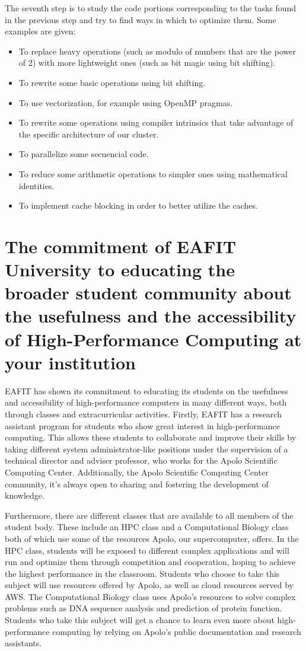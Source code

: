 \documentclass[11pt,a4paper,twocolumn]{article}
\begin{document}
The seventh step is to study the code portions corresponding to the tasks found in the previous step and try to find ways in which to optimize them. Some examples are given:

\begin{itemize}
    \item To replace heavy operations (such as modulo of numbers that are the power of 2) with more lightweight ones (such as bit magic using bit shifting).
    \item To rewrite some basic operations using bit shifting.
    \item To use vectorization, for example using OpenMP pragmas.
    \item To rewrite some operations using compiler intrinsics that take advantage of the specific architecture of our cluster.
    \item To parallelize some secuencial code.
    \item To reduce some arithmetic operations to simpler ones using mathematical identities.
    \item To implement cache blocking in order to better utilize the caches.
\end{itemize}

\section{The commitment of EAFIT University to educating the broader student community about the usefulness and the accessibility of High-Performance Computing at your institution}

EAFIT has shown its commitment to educating its students on the usefulness and accessibility of high-performance computers in many different ways, both through classes and extracurricular activities. Firstly, EAFIT has a research assistant program for students who show great interest in high-performance computing. This allows these students to collaborate and improve their skills by taking different system administrator-like positions under the supervision of a technical director and adviser professor, who works for the Apolo Scientific Computing Center. Additionally, the Apolo Scientific Computing Center community, it's always open to sharing and fostering the development of knowledge.

Furthermore, there are different classes that are available to all members of the student body. These include an HPC class and a Computational Biology class both of which use some of the resources Apolo, our supercomputer, offers. In the HPC class, students will be exposed to different complex applications and will run and optimize them through competition and cooperation, hoping to achieve the highest performance in the classroom. Students who choose to take this subject will use resources offered by Apolo, as well as cloud resources served by AWS. The Computational Biology class uses Apolo’s resources to solve complex problems such as DNA sequence analysis and prediction of protein function. Students who take this subject will get a chance to learn even more about high-performance computing by relying on Apolo's public documentation and research assistants.
\end{document}
